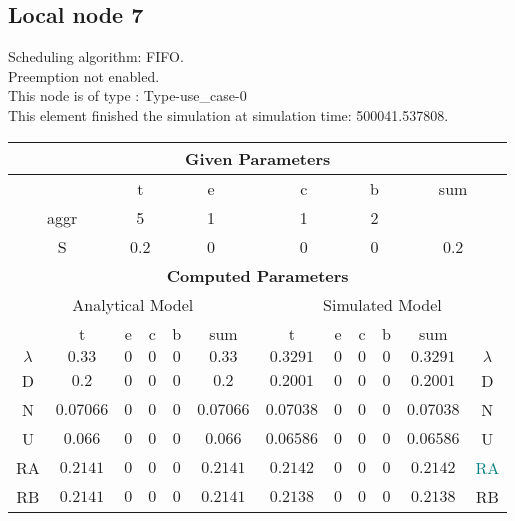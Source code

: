 \documentclass{article}
\begin{document}
\subsection{Local node 7}
Scheduling algorithm: FIFO.\\Preemption not enabled. \\This node is of type : Type-use\_case-0\\
This element finished the simulation at simulation time: 500041.537808.\\
\begin{table}[H]\centering\begin{tabular}{@{}c|cccc|c||cccc|c|c@{}}\toprule\multicolumn{12}{c}{\textbf{Given Parameters}}\\\midrule\multicolumn{2}{c|}{ } & \multicolumn{2}{c}{t} & \multicolumn{2}{c}{e} & \multicolumn{2}{c}{c} & \multicolumn{2}{c}{b} & \multicolumn{2}{|c}{sum} \\\midrule\multicolumn{2}{c|}{aggr} & \multicolumn{2}{c}{5} & \multicolumn{2}{c}{1} & \multicolumn{2}{c}{1} & \multicolumn{2}{c}{2} & \multicolumn{2}{|c}{ } \\ \midrule\multicolumn{2}{c|}{S} & \multicolumn{2}{c}{0.2} & \multicolumn{2}{c}{0} & \multicolumn{2}{c}{0} & \multicolumn{2}{c}{0} & \multicolumn{2}{|c}{0.2}\\ \midrule\midrule\multicolumn{12}{c}{\textbf{Computed Parameters}}\\ \midrule\multicolumn{6}{c||}{Analytical Model} & \multicolumn{6}{c}{Simulated Model}\\ 
 \midrule & t & e & c & b & sum & t & e & c & b & sum &  \\ \midrule$\lambda$ &$0.33$ & $0$ & $0$ & $0$ & $0.33$ & $0.3291$ & $0$ & $0$ & $0$ & $0.3291$& $\lambda$ \\D & $0.2$ & $0$ & $0$ & $0$ & $0.2$ & $0.2001$ & $0$ & $0$ & $0$ & $0.2001$& D\\N & $0.07066$ & $0$ & $0$ & $0$ & $0.07066$ & $0.07038$ & $0$ & $0$ & $0$ & $0.07038$& N\\U & $0.066$ & $0$ & $0$ & $0$ & $0.066$ & $0.06586$ & $0$ & $0$ & $0$ & $0.06586$& U\\RA & $0.2141$ & $0$ & $0$ & $0$ & $0.2141$ & $0.2142$ & $0$ & $0$ & $0$ & $0.2142$& \textcolor{teal}{RA}\\RB & $0.2141$ & $0$ & $0$ & $0$ & $0.2141$ & $0.2138$ & $0$ & $0$ & $0$ & $0.2138$& RB\\
\bottomrule
\end{tabular}
\end{table}
\filbreak
\end{document}

